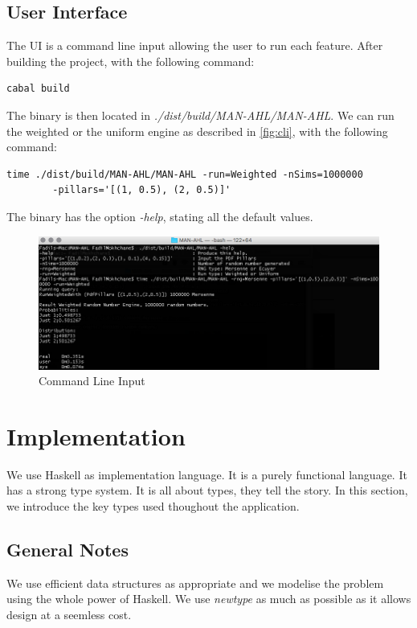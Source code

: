\documentclass[12pt,a4paper,article]{memoir} %
\begin{document}
\subsection{User Interface}
The UI is a command line input allowing the user to run each feature.
After building the project, with the following command:
\begin{verbatim}
cabal build
\end{verbatim}
The binary is then located in \emph{./dist/build/MAN-AHL/MAN-AHL}.
We can run the weighted or the uniform engine
 as described in \autoref{fig:cli}, with the following command:
\begin{verbatim}
time ./dist/build/MAN-AHL/MAN-AHL -run=Weighted -nSims=1000000
        -pillars='[(1, 0.5), (2, 0.5)]'
\end{verbatim}
 The binary has the option \emph{-help}, stating all the default values.
\begin{figure}[h!]
\begin{center}
\includegraphics[width=1\textwidth]{img/cli.png}
\caption{Command Line Input}
\label{fig:cli}
\end{center}
\end{figure}

\section{Implementation}

We use Haskell as implementation language. It is a purely functional language.
It has a strong type system. It is all about types, they tell the story.
In this section, we introduce the key types used thoughout the application.

\subsection{General Notes}
We use efficient data structures as appropriate and we modelise the problem using
the whole power of Haskell. 
We use \emph{newtype} as much as possible as it allows design at a 
seemless cost.
\end{document}
